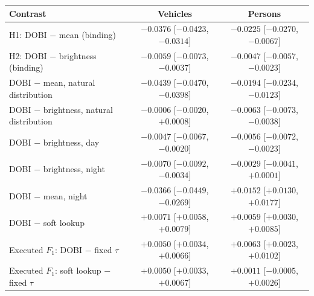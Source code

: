\begin{tabular}{lcc}
\toprule
Contrast & Vehicles & Persons \\
\midrule
H1: DOBI $-$ mean (binding) & $-0.0376$ [$-0.0423$, $-0.0314$] & $-0.0225$ [$-0.0270$, $-0.0067$] \\
H2: DOBI $-$ brightness (binding) & $-0.0059$ [$-0.0073$, $-0.0037$] & $-0.0047$ [$-0.0057$, $-0.0023$] \\
DOBI $-$ mean, natural distribution & $-0.0439$ [$-0.0470$, $-0.0398$] & $-0.0194$ [$-0.0234$, $-0.0123$] \\
DOBI $-$ brightness, natural distribution & $-0.0006$ [$-0.0020$, $+0.0008$] & $-0.0063$ [$-0.0073$, $-0.0038$] \\
DOBI $-$ brightness, day & $-0.0047$ [$-0.0067$, $-0.0020$] & $-0.0056$ [$-0.0072$, $-0.0023$] \\
DOBI $-$ brightness, night & $-0.0070$ [$-0.0092$, $-0.0034$] & $-0.0029$ [$-0.0041$, $+0.0001$] \\
DOBI $-$ mean, night & $-0.0366$ [$-0.0449$, $-0.0269$] & $+0.0152$ [$+0.0130$, $+0.0177$] \\
DOBI $-$ soft lookup & $+0.0071$ [$+0.0058$, $+0.0079$] & $+0.0059$ [$+0.0030$, $+0.0085$] \\
Executed $F_1$: DOBI $-$ fixed $\tau$ & $+0.0050$ [$+0.0034$, $+0.0066$] & $+0.0063$ [$+0.0023$, $+0.0102$] \\
Executed $F_1$: soft lookup $-$ fixed $\tau$ & $+0.0050$ [$+0.0033$, $+0.0067$] & $+0.0011$ [$-0.0005$, $+0.0026$] \\
\bottomrule
\end{tabular}
